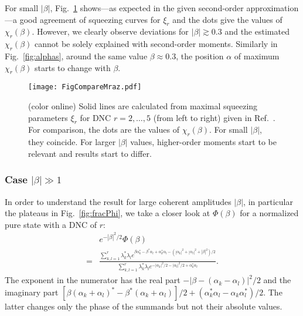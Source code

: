 \documentclass[aps,pra,twocolumn,showpacs,superscriptaddress,10pt]{revtex4-1}
\begin{document}
	For small $|\beta|$, Fig.~\ref{fig:compMraz} shows---as expected in the given second-order approximation---a good agreement of squeezing curves for $\xi_r$ and the dots give the values of $\chi_r(\beta)$.
	However, we clearly observe deviations for $|\beta|\gtrsim0.3$ and the estimated $\chi_r(\beta)$ cannot be solely explained with second-order moments.
	Similarly in Fig.~\ref{fig:alphas}, around the same value $\beta\approx0.3$, the position $\alpha$ of maximum $\chi_r(\beta)$ starts to change with $\beta$.

\begin{figure}[ht]
	 \texttt{[image: FigCompareMraz.pdf]}
	\caption{(color online)
		Solid lines are calculated from maximal squeezing parameters $\xi_r$ for DNC $r=2,\dots,5$ (from left to right) given in Ref.~\cite{Mraz2014}.
		For comparison, the dots are the values of $\chi_r(\beta)$.
		For small $|\beta|$, they coincide.
		For larger $|\beta|$ values, higher-order moments start to be relevant and results start to differ.
	}\label{fig:compMraz}
\end{figure}
	
\subsubsection*{Case $|\beta|\gg1$}
	In order to understand the result for large coherent amplitudes $|\beta|$, in particular the plateaus in Fig.~\ref{fig:fracPhi}, we take a closer look at $\Phi(\beta)$ for a normalized pure state with a DNC of $r$:
	\begin{align}
		&e^{-|\beta|^2/2}\Phi(\beta) \label{eq:Phi_W}
		\\\nonumber=&\frac{
		\sum\limits_{k,l=1}^{r}\lambda_{k}^{\ast}\lambda_{l} e^{\beta\alpha_{k}^{\ast}-\beta^{\ast}\alpha_{l}+\alpha_{k}^{\ast}\alpha_{l}-(|\alpha_{k}|^{2}+|\alpha_{l}|^{2}+|\beta|^2)/2}
		}
		{
		\sum\limits_{k,l=1}^{r}\lambda_{k}^{\ast} \lambda_{l}
		e^{-|\alpha_{k}|^{2}/2-|\alpha_{l}|^{2}/2+\alpha_{k}^{\ast}\alpha_{l}}
		}.
	\end{align}
	The exponent in the numerator has the real part $-|\beta-(\alpha_{k}-\alpha_{l})|^{2}/2$
	and the imaginary part $[\beta(\alpha_{k}+\alpha_{l})^{\ast}-\beta^{\ast}(\alpha_{k}+\alpha_{l})]/2+(\alpha_{k}^{\ast}\alpha_{l}-\alpha_{k}\alpha_{l}^{\ast})/2$.
	The latter changes only the phase of the summands but not their absolute values.
\end{document}
